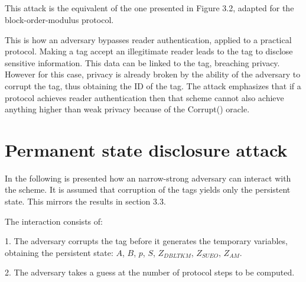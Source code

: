 \begin{adjustwidth}{-20pt}{}
{    %
    \<\< \< \\[-3ex]
    \< \< \< \<  \\[-1ex]
    \< \< \< \<  \\[-1ex]
    \< \< \< \<  \\[-1ex]
    }
    \end{adjustwidth}

    This attack is the equivalent of the one presented in Figure 3.2, adapted for the block-order-modulus protocol. 

    This is how an adversary bypasses reader authentication, applied to a practical protocol. Making a tag
    accept an illegitimate reader leads to the tag to disclose sensitive information. This data can be linked to the tag, breaching privacy.
    However for this case, privacy is already broken by the ability of the adversary to corrupt the tag, thus obtaining the ID of the tag.
    The attack emphasizes that if a protocol achieves reader authentication then that scheme cannot also achieve anything higher than weak
    privacy because of the Corrupt() oracle.

\section{Permanent state disclosure attack}

    In the following is presented how an narrow-strong adversary can interact with the scheme. It is assumed that 
    corruption of the tags yields only the persistent state. This mirrors the results in section 3.3.
    
    The interaction consists of:

    1. The adversary corrupts the tag before it generates the temporary variables, obtaining the persistent state: 
    $A$, $B$, $p$, $S$, $Z_{DBLTKM}$, $Z_{SUEO}$, $Z_{AM}$.

    2. The adversary takes a guess at the number of protocol steps to be computed.

